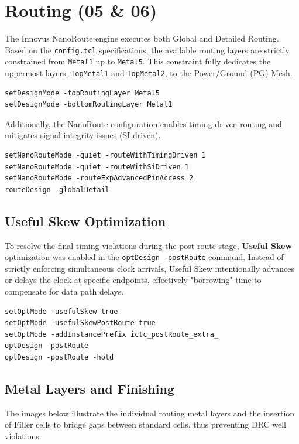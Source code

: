 \documentclass[12pt,a4paper]{article}
\begin{document}
\section{Routing (05 \& 06)}

The Innovus NanoRoute engine executes both Global and Detailed Routing. Based on the \texttt{config.tcl} specifications, the available routing layers are strictly constrained from \texttt{Metal1} up to \texttt{Metal5}. This constraint fully dedicates the uppermost layers, \texttt{TopMetal1} and \texttt{TopMetal2}, to the Power/Ground (PG) Mesh.

\begin{lstlisting}[caption={Routing layer constraints}]
setDesignMode -topRoutingLayer Metal5
setDesignMode -bottomRoutingLayer Metal1
\end{lstlisting}

Additionally, the NanoRoute configuration enables timing-driven routing and mitigates signal integrity issues (SI-driven).

\begin{lstlisting}[caption={NanoRoute configuration and execution}]
setNanoRouteMode -quiet -routeWithTimingDriven 1
setNanoRouteMode -quiet -routeWithSiDriven 1
setNanoRouteMode -routeExpAdvancedPinAccess 2
routeDesign -globalDetail
\end{lstlisting}

\subsection{Useful Skew Optimization}
To resolve the final timing violations during the post-route stage, \textbf{Useful Skew} optimization was enabled in the \texttt{optDesign -postRoute} command. Instead of strictly enforcing simultaneous clock arrivals, Useful Skew intentionally advances or delays the clock at specific endpoints, effectively "borrowing" time to compensate for data path delays.

\begin{lstlisting}[caption={Useful Skew in Post-Route Optimization}]
setOptMode -usefulSkew true
setOptMode -usefulSkewPostRoute true
setOptMode -addInstancePrefix ictc_postRoute_extra_
optDesign -postRoute
optDesign -postRoute -hold
\end{lstlisting}

\subsection{Metal Layers and Finishing}
The images below illustrate the individual routing metal layers and the insertion of Filler cells to bridge gaps between standard cells, thus preventing DRC well violations.
\end{document}
